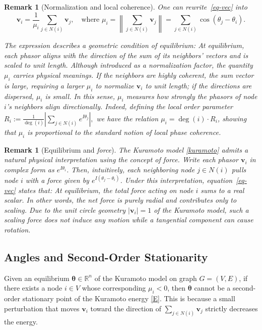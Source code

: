 \documentclass[11pt,reqno]{amsart}
\newtheorem{remark}[theorem]{Remark}
\theoremstyle{definition}
\begin{document}
\begin{remark}[Normalization and local coherence]
One can rewrite~\eqref{eq-vec} into
\[
\boldsymbol{v}_i = \frac{1}{\mu_i} \sum_{j\in N(i)} \boldsymbol{v}_j, 
\quad \text{where } \mu_i = \left\| \sum_{j\in N(i)} \boldsymbol{v}_j \right\| 
= \sum_{j\in N(i)} \cos(\theta_j - \theta_i).
\]

The expression describes a geometric condition of equilibrium:
\textit{At equilibrium, each phasor aligns with the direction of the sum of its neighbors' vectors and is scaled to unit length.}
Although introduced as a normalization factor, the quantity \( \mu_i \) carries physical meanings.  
If the neighbors are highly coherent, the sum vector is large, requiring a larger \( \mu_i \) to normalize \( \boldsymbol{v}_i \) to unit length; if the directions are dispersed, \( \mu_i \) is small.  
In this sense, \( \mu_i \) measures how strongly the phasors of node \( i \)'s neighbors align directionally.  
Indeed, defining the local order parameter $R_i := \frac{1}{\deg(i)} \left| \sum_{j \in N(i)} e^{I\theta_j} \right|,$
we have the relation \( \mu_i = \deg(i) \cdot R_i \), showing that \( \mu_i \) is proportional to the standard notion of local phase coherence.
\end{remark}

\begin{remark}[Equilibrium and \textit{force}]
The Kuramoto model \eqref{kuramoto} admits a natural physical interpretation using the concept of \textit{force}.  
Write each phasor \( \boldsymbol{v}_i \) in complex form as \( e^{I\theta_i} \).  
Then, intuitively, each neighboring node \( j \in N(i) \) pulls node \( i \) with a \textit{force} given by $e^{I(\theta_j-\theta_i)}$.
Under this interpretation, equation~\eqref{eq-vec} states that:
    \textit{At equilibrium, the total force acting on node \( i \) sums to a real scalar.}
In other words, the net force is purely radial and contributes only to scaling.  
Due to the unit circle geometry \( \left| \boldsymbol{v}_i \right| = 1 \) of the Kuramoto model, such a scaling force does not induce any motion while a tangential component can cause rotation.
\end{remark}
    
\subsection{Angles and Second-Order Stationarity}\label{sec:angle-stability}
Given an equilibrium $\boldsymbol{\theta}\in\mathbb R^n$ of the Kuramoto model on graph $G=(V,E)$, if there exists a node $i \in V$ whose corresponding $\mu_i < 0$, then $\boldsymbol{\theta}$ cannot be a second-order stationary point of the Kuramoto energy \eqref{E}.
This is because a small perturbation that moves $\boldsymbol{v}_i$ toward the direction of $\sum_{j\in N(i)} \boldsymbol{v}_j$ strictly decreases the energy.
\end{document}

